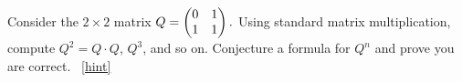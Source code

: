 \documentclass{book}
\begin{document}
\setcounter{project}{156}
\addtocounter{project}{-1}
\begin{activity}[]\label{fib-matrix}
\hypertarget{p-1020}{}%
Consider the \(2\times 2\) matrix \(Q =
\begin{pmatrix}
0 & 1\\
1 & 1
\end{pmatrix}.\) Using standard matrix multiplication, compute \(Q^2 = Q\cdot Q\), \(Q^3\), and so on.  Conjecture a formula for \(Q^n\) and prove you are correct.%
~\hfill{\tiny\hyperlink{a-156}{[hint]}\hypertarget{q-156}{}}\end{activity}
\end{document}
